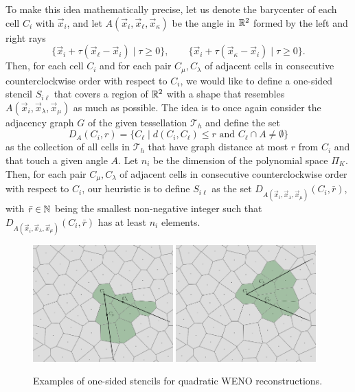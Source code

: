 To make this idea mathematically precise, let us denote the barycenter
of each cell $C_i$ with $\vec{x}_i$, and let
$A(\vec{x}_i,\vec{x}_\ell,\vec{x}_\kappa)$ be the angle in $\mathbb{R}^2$
formed by the left and right rays
\[
\{ \vec{x}_i + \tau (\vec{x}_\ell - \vec{x}_i) \mid \tau \geq 0 \},
\qquad
\{ \vec{x}_i + \tau (\vec{x}_\kappa - \vec{x}_i) \mid \tau \geq 0 \}.
\]
Then, for each cell $C_i$ and for each pair $C_\mu, C_\lambda$
of adjacent cells in consecutive counterclockwise order with respect
to $C_i$, we would like to define a one-sided stencil $S_{i\ell}$
that covers a region of $\mathbb{R}^2$ with a shape that resembles
$A(\vec{x}_i,\vec{x}_\lambda,\vec{x}_\mu)$ as much as possible.
The idea is to once again consider the adjacency graph $G$ of the given
tessellation $\mathcal{T}_h$ and define the set
\[
D_A(C_i,r) = \{ C_\ell
	\mid d(C_i,C_\ell) \leq r \text{ and } C_\ell \cap A \neq \emptyset\}
\]
as the collection of all cells in $\mathcal{T}_h$ that have graph distance
at most $r$ from $C_i$ and that touch a given angle $A$. Let $n_i$ be the
dimension of the polynomial space $\Pi_K$. Then, for each pair $C_\mu, C_\lambda$
of adjacent cells in consecutive counterclockwise order with respect
to $C_i$, our heuristic is to define $S_{i\ell}$ as the set
$D_{A(\vec{x}_i,\vec{x}_\lambda,\vec{x}_\mu)}(C_i,\bar{r})$,
with $\bar{r} \in \mathbb{N}$ being the smallest non-negative integer such that
$D_{A(\vec{x}_i,\vec{x}_\lambda,\vec{x}_\mu)}(C_i,\bar{r})$ has at least
$n_i$ elements.

\begin{figure}[tbp]
\centering
\includegraphics[width=0.48\textwidth]{cellsWENO1.png}
\hfill
\includegraphics[width=0.48\textwidth]{cellsWENO2.png}
\caption{Examples of one-sided stencils for quadratic WENO reconstructions.}
\label{fig:stencils}
\end{figure}


